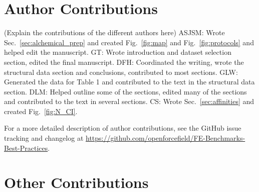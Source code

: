 \documentclass[9pt,bestpractices]{livecoms}
\newcommand{\githubrepository}{\url{https://github.com/openforcefield/FE-Benchmarks-Best-Practices}}  %
\begin{document}
\section{Author Contributions}
%

(Explain the contributions of the different authors here)
ASJSM: Wrote Sec.~\ref{sec:alchemical_prep} and created Fig.~\ref{fig:map} and Fig.~\ref{fig:protocols} and helped edit the manuscript. 
GT: Wrote introduction and dataset selection section, edited the final manuscript.
DFH: Coordinated the writing, wrote the structural data section and conclusions, contributed to most sections.
GLW: Generated the data for Table 1 and contributed to the text in the structural data section.
DLM: Helped outline some of the sections, edited many of the sections and contributed to the text in several sections.
CS: Wrote Sec.~\ref{sec:affinities} and created Fig.~\ref{fig:N_CI}.

For a more detailed description of author contributions,
see the GitHub issue tracking and changelog at \githubrepository.


\section{Other Contributions}
%
\end{document}
